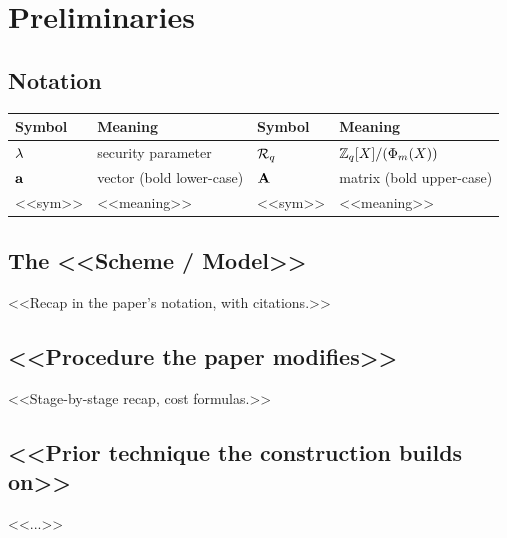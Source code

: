 \section{Preliminaries}\label{sec:prelim}
\subsection{Notation}
\begin{table}[h]
\centering\scriptsize
\begin{tabular}{@{}ll@{\qquad}ll@{}}
\toprule
Symbol & Meaning & Symbol & Meaning \\
\midrule
$\lambda$ & security parameter & $\mathcal{R}_q$ & $\mathbb{Z}_q[X]/(\Phi_m(X))$ \\
$\mathbf{a}$ & vector (bold lower-case) & $\mathbf{A}$ & matrix (bold upper-case) \\
<<sym>> & <<meaning>> & <<sym>> & <<meaning>> \\
\bottomrule
\end{tabular}
\end{table}

\subsection{The <<Scheme / Model>>}
<<Recap in the paper's notation, with citations.>>

\subsection{<<Procedure the paper modifies>>}
<<Stage-by-stage recap, cost formulas.>>

\subsection{<<Prior technique the construction builds on>>}
\begin{definition}[<<name>>]\label{def:prior}
<<...>>
\end{definition}
